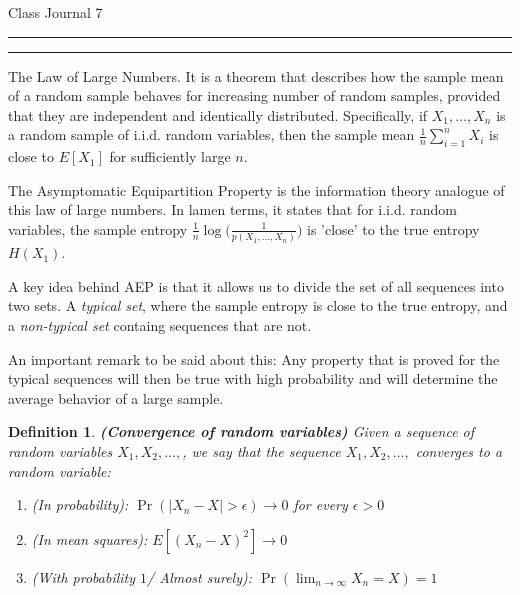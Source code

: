 \documentclass{article}
\newtheorem{definition}{Definition}
\newcounter{questionCounter}
\newcounter{partCounter}[questionCounter]
\newenvironment{question}[2][\arabic{questionCounter}]{%
    \setcounter{partCounter}{0}%
    \vspace{.25in} \hrule \vspace{0.5em}%
        \noindent{\bf \large#2}%
    \vspace{0.5em} \hrule \vspace{.10in}%
    \addtocounter{questionCounter}{1}%
}{}
\begin{document}
\begin{center}
{\Huge Class Journal 7}\\
\end{center}

\vspace{5mm}


\vspace{5mm}


\begin{question}{Main Theorems/Ideas in the lecture}
The Law of Large Numbers. It is a theorem that describes how the sample mean of a random sample behaves for increasing number of random samples, provided that they are independent and identically distributed. Specifically, if $X_1,\ldots, X_n$ is a random sample of i.i.d. random variables, then the sample mean $\frac{1}{n}\sum_{i=1}^n X_i$ is close to $E[X_1]$ for sufficiently large $n$.

The Asymptomatic Equipartition Property is the information theory analogue of this law of large numbers. In lamen terms, it states that for i.i.d. random variables, the sample entropy $\frac{1}{n}\log \Big( \frac{1}{p(X_1,\ldots, X_n)} \Big)$ is 'close' to the true entropy $H(X_1)$.

A key idea behind AEP is that it allows us to divide the set of all sequences into two sets. A \emph{typical set}, where the sample entropy is close to the true entropy, and a \emph{non-typical set} containg sequences that are not.

An important remark to be said about this: Any property that is proved for the typical sequences will then be true with high probability and will determine
the average behavior of a large sample.

\begin{definition} \textbf{(Convergence of random variables)} Given a sequence of random variables $X_1, X_2, \ldots, $, we say that the sequence $X_1, X_2, \ldots,$ converges to a random variable: 
\begin{enumerate}
    \item (In probability): $\Pr(|X_n - X| > \epsilon) \to 0$ for every $\epsilon > 0$
    \item (In mean squares): $E[(X_n - X)^2]\to 0$
    \item (With probability $1$/ Almost surely): $\Pr(\lim_{n\to\infty}X_n = X) = 1$
\end{enumerate}\end{definition}


\end{question}
\end{document}
